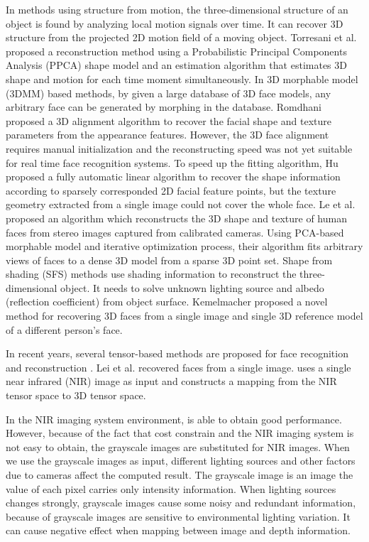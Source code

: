 In methods using structure from motion, the three-dimensional structure of an object is found by analyzing local motion signals over time. It can recover 3D structure from the projected 2D motion field of a moving object.
Torresani et al.\cite{torresani2008nonrigid} proposed a reconstruction method using a Probabilistic Principal Components Analysis (PPCA) shape model and an estimation algorithm that estimates 3D shape and motion for each time moment simultaneously. 
In 3D morphable model (3DMM) based methods, by given a large database of 3D face models, any arbitrary face can be generated by morphing in the database.		
Romdhani \cite{romdhani2003efficient} proposed a 3D alignment algorithm to recover the facial shape and texture parameters from the appearance features. However, the 3D face alignment requires manual initialization and the reconstructing speed was not yet suitable for real time face recognition systems. 					
To speed up the fitting algorithm, Hu \cite{hu2004automatic} proposed a fully automatic linear algorithm to recover the shape information according to sparsely corresponded 2D facial feature points, but the texture geometry extracted from a single image could not cover the whole face.
Le et al.\cite{le2010accurate} proposed an algorithm which reconstructs the 3D shape and texture of human faces from stereo images captured from calibrated cameras. Using PCA-based morphable model and iterative optimization process, their algorithm fits arbitrary views of faces to a dense 3D model from a sparse 3D point set.						
Shape from shading (SFS) methods use shading information to reconstruct the three-dimensional object. It needs to solve unknown lighting source and albedo (reflection coefficient) from object surface.
Kemelmacher \cite{kemelmacher20113d} proposed a novel method for recovering 3D faces from a single image and single 3D reference model of a different person’s face.

In recent years, several tensor-based methods are proposed for face recognition and reconstruction \cite{vasilescu2002multilinear, kolda2009tensor}. 
Lei et al. \cite{lei2008face} recovered faces from a single image. \cite{lei2008face} uses a single near infrared (NIR) image as input and constructs a mapping from the NIR tensor space to 3D tensor space.

In the NIR imaging system environment, \cite{lei2008face} is able to obtain good performance. 
However, because of the fact that cost constrain and the NIR imaging system is not easy to obtain, the grayscale images are substituted for NIR images. 
When we use the grayscale images as input, different lighting sources and other factors due to cameras affect the computed result. 
The grayscale image is an image the value of each pixel carries only intensity information. 
When lighting sources changes strongly, grayscale images cause some noisy and redundant information, because of grayscale images are sensitive to environmental lighting variation. 
It can cause negative effect when mapping between image and depth information.

